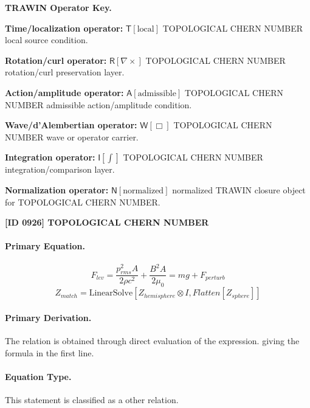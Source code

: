 \par\vspace{0.45\baselineskip}
\noindent\begin{minipage}[t]{\linewidth}
\begingroup
\small
\raggedright
\textbf{TRAWIN Operator Key.}\par
\noindent\textbf{Time/localization operator:} $\mathsf{T}\!\left[\mathrm{local}\right]$ TOPOLOGICAL CHERN NUMBER local source condition.\par
\noindent\textbf{Rotation/curl operator:} $\mathsf{R}\!\left[\nabla\times\right]$ TOPOLOGICAL CHERN NUMBER rotation/curl preservation layer.\par
\noindent\textbf{Action/amplitude operator:} $\mathsf{A}\!\left[\mathrm{admissible}\right]$ TOPOLOGICAL CHERN NUMBER admissible action/amplitude condition.\par
\noindent\textbf{Wave/d'Alembertian operator:} $\mathsf{W}\!\left[\Box\right]$ TOPOLOGICAL CHERN NUMBER wave or operator carrier.\par
\noindent\textbf{Integration operator:} $\mathsf{I}\!\left[\int\right]$ TOPOLOGICAL CHERN NUMBER integration/comparison layer.\par
\noindent\textbf{Normalization operator:} $\mathsf{N}\!\left[\mathrm{normalized}\right]$ normalized TRAWIN closure object for TOPOLOGICAL CHERN NUMBER.\par
\endgroup
\end{minipage}

\clearpage
\noindent\textbf{[ID 0926] TOPOLOGICAL CHERN NUMBER}\par
\vspace{0.35em}
\paragraph{Primary Equation.}
\[
F_{lev} = \frac{p_{rms}^2 A}{2 \rho c^2} + \frac{B^2 A}{2 \mu_0} = mg + F_{perturb}
\]
\[
Z_{match} = \text{LinearSolve}[Z_{hemisphere} \otimes I, Flatten[Z_{sphere}]]
\]

\paragraph{Primary Derivation.}
The relation is obtained through direct evaluation of the expression. giving the formula in the first line.
\paragraph{Equation Type.}
This statement is classified as a other relation.

